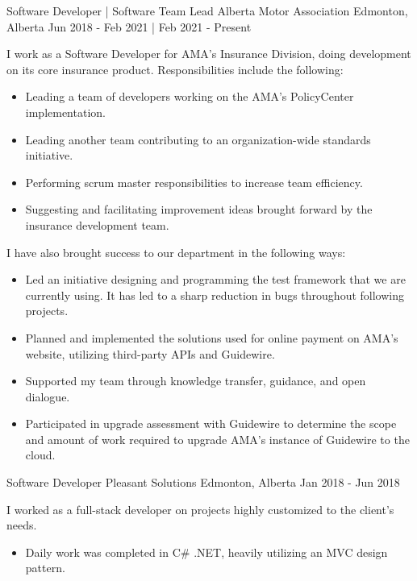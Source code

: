 
\begin{cventries}
    \cventry
        {Software Developer | Software Team Lead}
        {Alberta Motor Association}
        {Edmonton, Alberta}
        {Jun 2018 - Feb 2021 | Feb 2021 - Present}
        {
            I work as a Software Developer for AMA’s Insurance Division, doing development on its core insurance product.  Responsibilities include the following:
            \begin{itemize}
                \item Leading a team of developers working on the AMA's PolicyCenter implementation.
                \item Leading another team contributing to an organization-wide standards initiative.
                \item Performing scrum master responsibilities to increase team efficiency.
                \item Suggesting and facilitating improvement ideas brought forward by the insurance development team.
            \end{itemize}
            I have also brought success to our department in the following ways:
            \begin{itemize}
                \item Led an initiative designing and programming the test framework that we are currently using.  It has led to a sharp reduction in bugs throughout following projects.
                \item Planned and implemented the solutions used for online payment on AMA’s website, utilizing third-party APIs and Guidewire.
                \item Supported my team through knowledge transfer, guidance, and open dialogue.
                \item Participated in upgrade assessment with Guidewire to determine the scope and amount of work required to upgrade AMA's instance of Guidewire to the cloud.
            \end{itemize}
        }
    \cventry
        {Software Developer}
        {Pleasant Solutions}
        {Edmonton, Alberta}
        {Jan 2018 - Jun 2018}
        {
            I worked as a full-stack developer on projects highly customized to the client’s needs.
            \begin{itemize}
                \item Daily work was completed in C\# .NET, heavily utilizing an MVC design pattern.

\end{itemize}}
\end{cventries}
